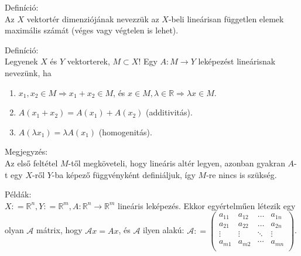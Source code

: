 \documentclass[12pt,a4paper]{scrartcl}
\providecommand{\tightlist}{%
  \setlength{\itemsep}{0pt}\setlength{\parskip}{0pt}}
\newenvironment{definicio}{}{}
\newenvironment{megjegyzes}{}{}
\newenvironment{pelda}{}{}
\begin{document}
\begin{definicio}

Definíció:\\
Az \(X\) vektortér dimenziójának nevezzük az \(X\)-beli lineárisan
független elemek maximális számát (véges vagy végtelen is lehet).

\end{definicio}

\begin{definicio}

Definíció:\\
Legyenek \(X\) és \(Y\) vektorterek, \(M \subset X\)! Egy
\(\left. A:M\rightarrow Y \right.\) leképezést lineárisnak nevezünk, ha

\begin{enumerate}
\def\labelenumi{\arabic{enumi}.}
\tightlist
\item
  \(\left. x_{1},x_{2} \in M\Rightarrow x_{1} + x_{2} \in M \right.\),
  és
  \(\left. x \in M,\lambda \in {\mathbb{R}}\Rightarrow\lambda x \in M \right.\).
\item
  \(A\left( {x_{1} + x_{2}} \right) = A\left( x_{1} \right) + A\left( x_{2} \right)\)
  (additivitás).
\item
  \(A\left( {\lambda x_{1}} \right) = \lambda A\left( x_{1} \right)\)
  (homogenitás).
\end{enumerate}

\end{definicio}

\begin{megjegyzes}

Megjegyzés:\\
Az első feltétel \(M\)-től megköveteli, hogy lineáris altér legyen,
azonban gyakran \(A\)-t egy \(X\)-ről \(Y\)-ba képező függvényként
definiáljuk, így \(M\)-re nincs is szükség.

\end{megjegyzes}

\begin{pelda}

Példák:\\
\(\left. X: = {\mathbb{R}}^{n},Y: = {\mathbb{R}}^{m},A:{\mathbb{R}}^{n}\rightarrow{\mathbb{R}}^{m} \right.\)
lineáris leképezés. Ekkor egyértelműen létezik egy olyan \(\mathcal{A}\)
mátrix, hogy \(\mathcal{A}x = Ax\), és \(\mathcal{A}\) ilyen alakú:
\(\mathcal{A}: = \left( \begin{array}{llll} a_{11} & a_{12} & \ldots & a_{1n} \\ a_{21} & a_{22} & \ldots & a_{2n} \\  \vdots & \vdots & \ddots & \vdots \\ a_{m1} & a_{m2} & \cdots & a_{mn} \\ \end{array} \right)\).

\end{pelda}
\end{document}
